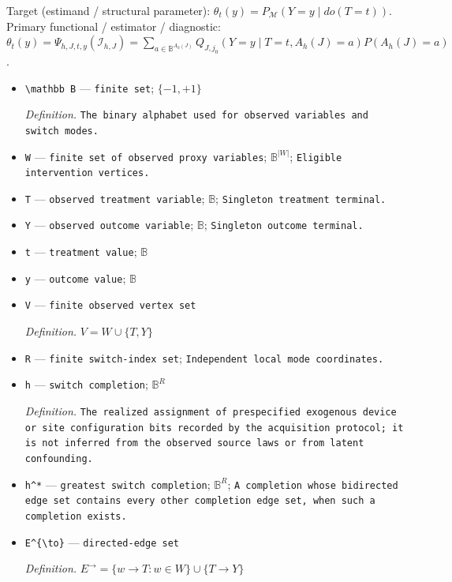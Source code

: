 \documentclass{article}
\begin{document}
Target (estimand / structural parameter): \(\theta_t(y)=P_{\mathcal M}(Y=y\mid do(T=t))\).
Primary functional / estimator / diagnostic: \(\theta_t(y)=\Psi_{h,J,t,y}(\mathcal I_{h,J})=\sum_{a\in\mathbb B^{A_h(J)}}Q_{J,j_0}(Y=y\mid T=t,A_h(J)=a)P(A_h(J)=a)\).
\begin{itemize}
  \item \texttt{\textbackslash{}\allowbreak{}mathbb B} --- \texttt{finite set}; \(\{-1,+1\}\)
  \par\smallskip\noindent\emph{Definition.} \texttt{The binary alphabet used for observed variables and switch modes.}
  \item \texttt{W} --- \texttt{finite set of observed proxy variables}; \(\mathbb B^{|W|}\); \texttt{Eligible intervention vertices.}
  \item \texttt{T} --- \texttt{observed treatment variable}; \(\mathbb B\); \texttt{Singleton treatment terminal.}
  \item \texttt{Y} --- \texttt{observed outcome variable}; \(\mathbb B\); \texttt{Singleton outcome terminal.}
  \item \texttt{t} --- \texttt{treatment value}; \(\mathbb B\)
  \item \texttt{y} --- \texttt{outcome value}; \(\mathbb B\)
  \item \texttt{V} --- \texttt{finite observed vertex set}
  \par\smallskip\noindent\emph{Definition.} \(V=W\cup\{T,Y\}\)
  \item \texttt{R} --- \texttt{finite switch-\allowbreak{}index set}; \texttt{Independent local mode coordinates.}
  \item \texttt{h} --- \texttt{switch completion}; \(\mathbb B^R\)
  \par\smallskip\noindent\emph{Definition.} \texttt{The realized assignment of prespecified exogenous device or site configuration bits recorded by the acquisition protocol;\allowbreak{} it is not inferred from the observed source laws or from latent confounding.}
  \item \texttt{h\textasciicircum{}*} --- \texttt{greatest switch completion}; \(\mathbb B^R\); \texttt{A completion whose bidirected edge set contains every other completion edge set,\allowbreak{} when such a completion exists.}
  \item \texttt{E\textasciicircum{}\{\textbackslash{}\allowbreak{}to\}\allowbreak{}} --- \texttt{directed-\allowbreak{}edge set}
  \par\smallskip\noindent\emph{Definition.} \(E^{\to}=\{w\to T:w\in W\}\cup\{T\to Y\}\)

\end{itemize}
\end{document}
